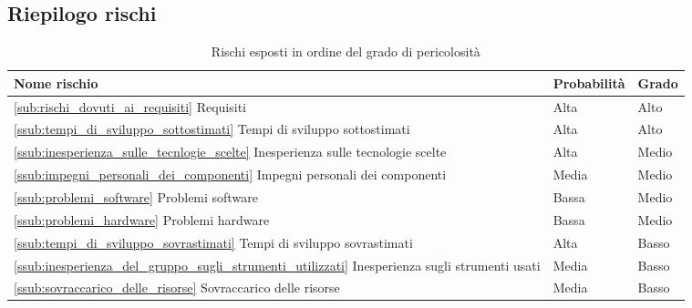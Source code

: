 	\subsection{Riepilogo rischi} %
	\label{sub:riepilogo_rischi}
		\begin{table}[!h]
			\begin{center}
				\begin{tabularx}{0.9\textwidth}{|l|l|X|}
					\hline
					\textbf{Nome rischio} & \textbf{Probabilità} & \textbf{Grado} \\
					\hline
					\ref{sub:rischi_dovuti_ai_requisiti} Requisiti &
					Alta &
					Alto \\
					\hline
					\ref{ssub:tempi_di_sviluppo_sottostimati} Tempi di sviluppo sottostimati &
					Alta &
					Alto \\
					\hline
					\ref{ssub:inesperienza_sulle_tecnlogie_scelte} Inesperienza sulle tecnologie scelte &
					Alta &
					Medio \\
					\hline
					\ref{ssub:impegni_personali_dei_componenti} Impegni personali dei componenti &
					Media &
					Medio \\
					\hline
					\ref{ssub:problemi_software} Problemi software &
					Bassa &
					Medio \\
					\hline
					\ref{ssub:problemi_hardware} Problemi hardware &
					Bassa &
					Medio \\
					\hline
					\ref{ssub:tempi_di_sviluppo_sovrastimati}  Tempi di sviluppo sovrastimati &
					Alta &
					Basso \\
					\hline
					\ref{ssub:inesperienza_del_gruppo_sugli_strumenti_utilizzati} Inesperienza sugli strumenti usati &
					Media &
					Basso \\
					\hline
					\ref{ssub:sovraccarico_delle_risorse} Sovraccarico delle risorse &
					Media &
					Basso \\
					\hline		
				\end{tabularx}
			\end{center}
		\caption{Rischi esposti in ordine del grado di pericolosità}
		\end{table}
		
	
